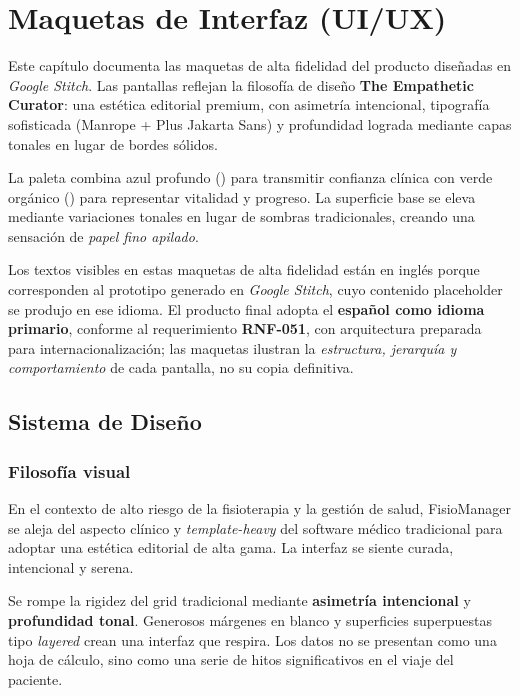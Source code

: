 
\chapter{Maquetas de Interfaz (UI/UX)}\label{ch:maquetas}

Este capítulo documenta las maquetas de alta fidelidad del producto diseñadas en \textit{Google Stitch}. Las pantallas reflejan la filosofía de diseño \textbf{The Empathetic Curator}: una estética editorial premium, con asimetría intencional, tipografía sofisticada (Manrope + Plus Jakarta Sans) y profundidad lograda mediante capas tonales en lugar de bordes sólidos.

La paleta combina azul profundo () para transmitir confianza clínica con verde orgánico () para representar vitalidad y progreso. La superficie base  se eleva mediante variaciones tonales en lugar de sombras tradicionales, creando una sensación de \textit{papel fino apilado}.

\begin{infobox}[title={Nota sobre el idioma de las maquetas}]
  Los textos visibles en estas maquetas de alta fidelidad están en inglés porque corresponden al prototipo generado en \textit{Google Stitch}, cuyo contenido placeholder se produjo en ese idioma. El producto final adopta el \textbf{español como idioma primario}, conforme al requerimiento \textbf{RNF-051}, con arquitectura preparada para internacionalización; las maquetas ilustran la \emph{estructura, jerarquía y comportamiento} de cada pantalla, no su copia definitiva.
\end{infobox}

\section{Sistema de Diseño}

\subsection{Filosofía visual}

\begin{infobox}[title={The Empathetic Curator}]
  En el contexto de alto riesgo de la fisioterapia y la gestión de salud, FisioManager se aleja del aspecto clínico y \textit{template-heavy} del software médico tradicional para adoptar una estética editorial de alta gama. La interfaz se siente curada, intencional y serena.

  Se rompe la rigidez del grid tradicional mediante \textbf{asimetría intencional} y \textbf{profundidad tonal}. Generosos márgenes en blanco y superficies superpuestas tipo \textit{layered} crean una interfaz que respira. Los datos no se presentan como una hoja de cálculo, sino como una serie de hitos significativos en el viaje del paciente.
\end{infobox}

